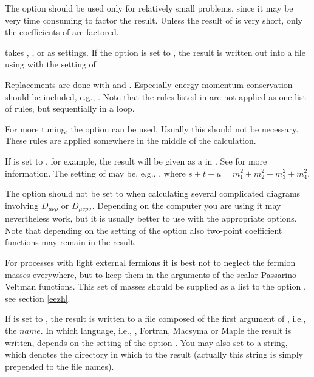 The  option should be used only for relatively small problems, since it may 
be very time consuming to factor the result. Unless the result of  is 
very short, only 
the coefficients of  are factored.

 takes , ,  or 
as settings. If the option  is set to , the result is written out 
into a file using  with the setting of .

Replacements are  
done with  and .
Especially energy momentum conservation should be included, e.g., 
.
Note that the rules listed in  are not applied as one list of rules, 
but sequentially in a loop.

For more tuning, the option  can be used. Usually this should not be necessary. These rules are applied somewhere in the middle of the calculation.

If  is set to , for example, the result will be given as
a  in . See  for more information.
The setting of  may be, e.g., 
, where  $s + t + u = m_1^2 + m_2^2 + m_3^2 + m_4^2$.

The option  should not be set to  when calculating several complicated diagrams involving $D_{\mu \nu \rho}$ or $D_{\mu \nu \rho \sigma}$. 
Depending on the computer you are using  it may nevertheless work, but it is usually better 
to use  with the appropriate options. Note that depending on the setting of the 
option  also two-point coefficient functions may remain in the result.

For processes with light external fermions it is best not to neglect the fermion masses
everywhere, but to keep them in the arguments of the scalar Passarino-Veltman functions.
This set of masses should be supplied as a list to the option , see section \ref{eezh}. 

If  is set to , the result is written to a file composed of the first
argument of , i.e., the $name$. In which language, i.e., 
\mma, Fortran, Macsyma or Maple the result is written, depends on the setting of the option .
You may also set  to a string, which denotes the directory 
in which to the result (actually this string is simply prepended to the file names).

